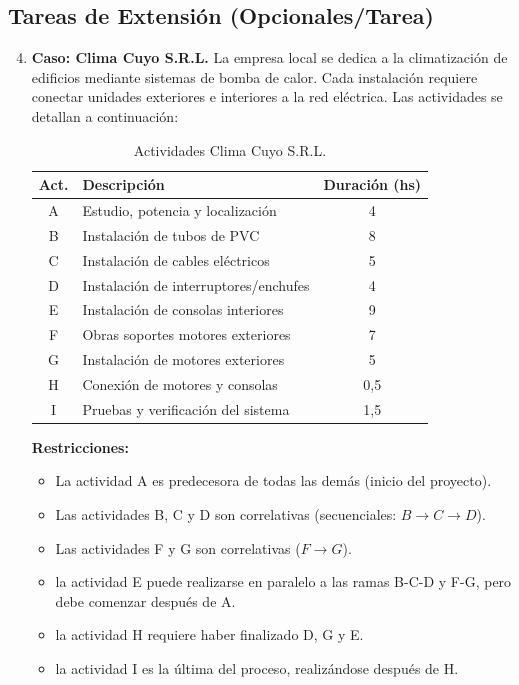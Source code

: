 \documentclass[../main]{subfiles}
\begin{document}
\subsection*{Tareas de Extensión (Opcionales/Tarea)}
\begin{enumerate}
  \setcounter{enumi}{3}
  \item \textbf{Caso: Clima Cuyo S.R.L.}
    La empresa local se dedica a la climatización de edificios
    mediante sistemas de bomba de calor. Cada instalación requiere
    conectar unidades exteriores e interiores a la red eléctrica. Las
    actividades se detallan a continuación:

    \begin{table}[h!]
      \centering
      \begin{tabular}{|c|l|c|} \hline
        \textbf{Act.} & \textbf{Descripción} & \textbf{Duración (hs)}
        \\ \hline \hline
        A & Estudio, potencia y localización & 4 \\
        B & Instalación de tubos de PVC & 8 \\
        C & Instalación de cables eléctricos & 5 \\
        D & Instalación de interruptores/enchufes & 4 \\
        E & Instalación de consolas interiores & 9 \\
        F & Obras soportes motores exteriores & 7 \\
        G & Instalación de motores exteriores & 5 \\
        H & Conexión de motores y consolas & 0,5 \\
        I & Pruebas y verificación del sistema & 1,5 \\ \hline
      \end{tabular}
      \caption{Actividades Clima Cuyo S.R.L.}
      \label{tab:clima_cuyo}
    \end{table}

    \textbf{Restricciones:}
    \begin{itemize}
      \item La actividad A es predecesora de todas las demás (inicio
        del proyecto).
      \item Las actividades B, C y D son correlativas (secuenciales:
        $B \rightarrow C \rightarrow D$).
      \item Las actividades F y G son correlativas ($F \rightarrow G$).
      \item la actividad E puede realizarse en paralelo a las ramas
        B-C-D y F-G, pero debe comenzar después de A.
      \item la actividad H requiere haber finalizado D, G y E.
      \item la actividad I es la última del proceso, realizándose
        después de H.
    \end{itemize}


\end{enumerate}
\end{document}
